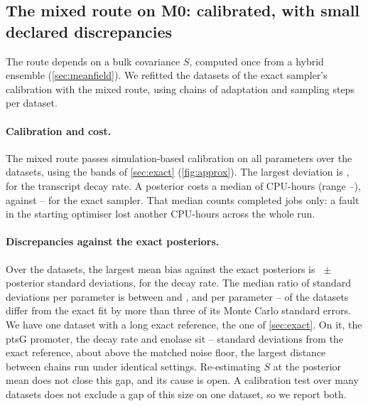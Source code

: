 \subsection{The mixed route on M0: calibrated, with small declared discrepancies}
\label{sec:approx}

The route depends on a bulk covariance $S$, computed once from a hybrid ensemble (\cref{sec:meanfield}). We refitted the  datasets of the exact sampler's calibration with the mixed
route, using  chains of  adaptation and 
sampling steps per dataset.

\paragraph{Calibration and cost.} The mixed route passes simulation-based calibration
on all  parameters over the  datasets, using the bands of
\cref{sec:exact} (\cref{fig:approx}). The largest deviation is , for
the transcript decay rate. A posterior costs a median of  CPU-hours
(range --), against --
for the exact sampler. That median counts completed jobs only: a fault in the
starting optimiser lost another  CPU-hours across the whole run.

\paragraph{Discrepancies against the exact posteriors.} Over the  datasets,
the largest mean bias against the exact posteriors is ~$\pm$~
 posterior standard deviations, for the decay rate. The median ratio of standard deviations per parameter is between  and , and per parameter -- of the datasets differ from the exact fit by more than three of its Monte Carlo standard errors. We have one dataset with a long exact reference, the one of \cref{sec:exact}. On it, the ptsG promoter, the decay rate and
enolase sit -- standard deviations from the exact
reference, about  above the matched noise floor, the largest distance between chains run under identical settings. Re-estimating $S$ at
the posterior mean does not close this gap, and its cause is open. A calibration test
over many datasets does not exclude a gap of this size on one dataset, so we report
both.

